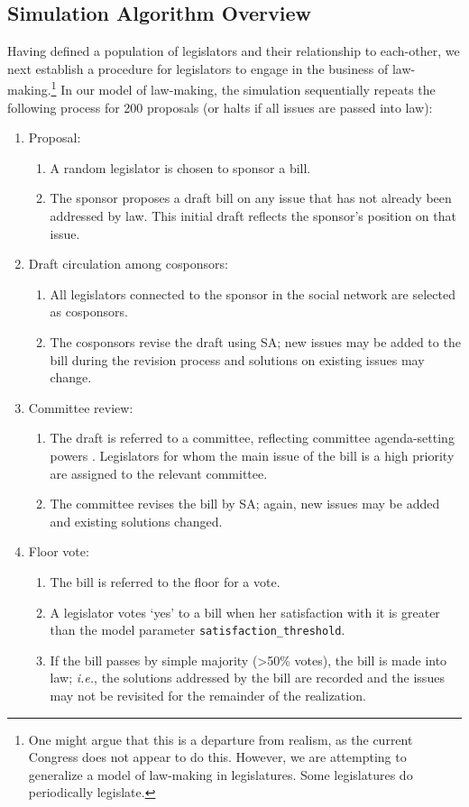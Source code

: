 \documentclass[pdftex,12pt,oribibl]{llncs}
\begin{document}
\subsection{Simulation Algorithm Overview}
Having defined a population of legislators and their relationship to each-other, we next establish a procedure for legislators to engage in the business of law-making.\footnote{One might argue that this is a departure from realism, as the current Congress does not appear to do this.
However, we are attempting to generalize a model of law-making in legislatures.
Some legislatures do periodically legislate.}
In our model of law-making, the simulation sequentially repeats the following process for 200 proposals (or halts if all issues are passed into law):
\begin{enumerate}
\item Proposal:
\begin{enumerate}
\item A random legislator is chosen to sponsor a bill.
\item The sponsor proposes a draft bill on any issue that has not already been addressed by law. This initial draft reflects the sponsor's position on that issue.
\end{enumerate}
\item Draft circulation among cosponsors:
\begin{enumerate}
\item All legislators connected to the sponsor in the social network are selected as cosponsors.
\item The cosponsors revise the draft using SA; new issues may be added to the bill during the revision process and solutions on existing issues may change.
\end{enumerate}
\item Committee review:
\begin{enumerate}
\item The draft is referred to a committee, reflecting committee agenda-setting powers \parencite{cm93, cm05}.
Legislators for whom the main issue of the bill is a high priority are assigned to the relevant committee.
\item The committee revises the bill by SA; again, new issues may be added and existing solutions changed.
\end{enumerate}
\item Floor vote:
\begin{enumerate}
\item The bill is referred to the floor for a vote.
\item A legislator votes `yes' to a bill when her satisfaction with it is greater than the model parameter \texttt{satisfaction\_threshold}.
\item If the bill passes by simple majority (\textgreater 50\% votes), the bill is made into law; \textit{i.e.}, the solutions addressed by the bill are recorded and the issues may not be revisited for the remainder of the realization.
\end{enumerate}
\end{enumerate}
\end{document}
